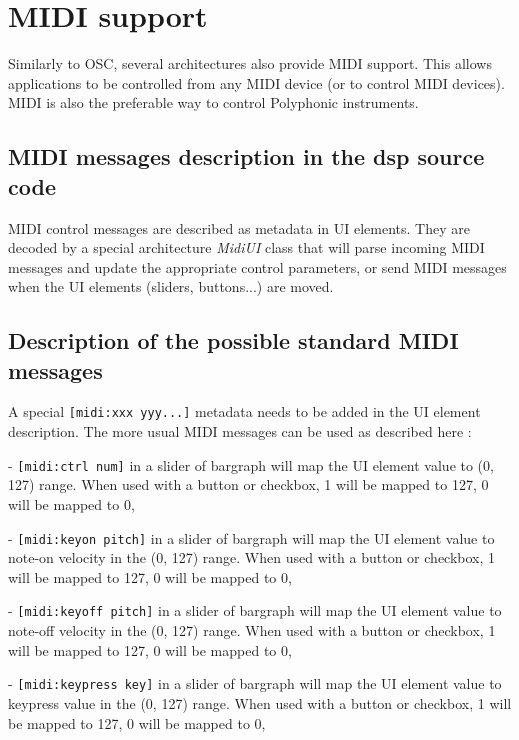 \chapter{MIDI support} \label{sec:midi}

Similarly to OSC, several \faust architectures also provide MIDI support. This allows \faust applications to be controlled from any MIDI device (or to control MIDI devices). MIDI is also the preferable way to control Polyphonic instruments.

\section{MIDI messages description in the dsp source code}

MIDI control messages are described as metadata in UI elements. They are decoded by a special architecture \emph{MidiUI} class that will parse incoming MIDI messages and update the appropriate control parameters, or send MIDI messages when the UI elements (sliders, buttons...) are moved.

\section{Description of the possible standard MIDI messages}

A special \lstinline'[midi:xxx yyy...]' metadata needs to be added in the UI  element description. The more usual MIDI messages can be used as described here : 

- \lstinline'[midi:ctrl num]' in a slider of bargraph will map the UI element value to (0, 127) range. When used with a button or checkbox, 1 will be mapped to 127, 0 will be mapped to 0,

- \lstinline'[midi:keyon pitch]' in a slider of bargraph will map the UI element value to note-on velocity in the (0, 127) range. When used with a button or checkbox, 1 will be mapped to 127, 0 will be mapped to 0,

- \lstinline'[midi:keyoff pitch]' in a slider of bargraph will map the UI element value to note-off velocity in the (0, 127) range. When used with a button or checkbox, 1 will be mapped to 127, 0 will be mapped to 0,

- \lstinline'[midi:keypress key]' in a slider of bargraph will map the UI element value to keypress value in the (0, 127) range. When used with a button or checkbox, 1 will be mapped to 127, 0 will be mapped to 0,

